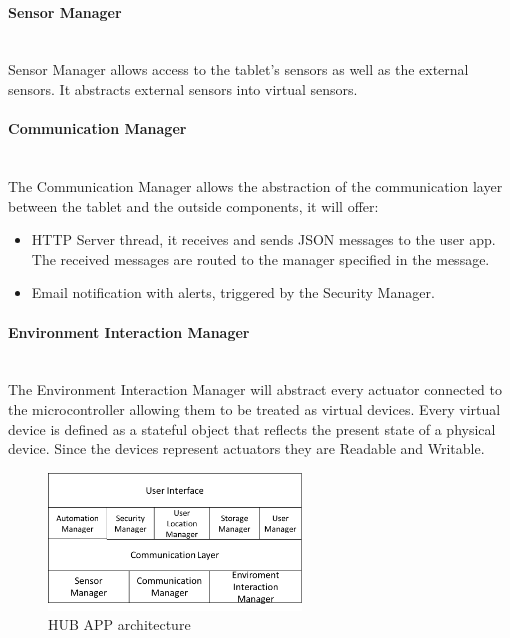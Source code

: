 \paragraph{Sensor Manager}\mbox{}\\
Sensor Manager allows access to the tablet's sensors as well as the external sensors. It abstracts external sensors into virtual sensors.


\paragraph{Communication Manager}\mbox{}\\
The Communication Manager allows the abstraction of the communication layer between the tablet and the outside components, it will offer:

\begin{itemize}
  \item HTTP Server thread, it receives and sends JSON messages to the user app. The received messages are routed to the manager specified in the message.
  \item Email notification with alerts, triggered by the Security Manager.
\end{itemize}

\paragraph{Environment Interaction Manager}\mbox{}\\
The Environment Interaction Manager will abstract every actuator connected to the microcontroller allowing them to be treated as virtual devices. Every virtual device is defined as a stateful object that reflects the present state of a physical device. Since the devices represent actuators they are Readable and Writable.

\begin{figure}[h]
\centering
\includegraphics[width=0.6\textwidth]{Figures/software2}
\caption{HUB APP architecture }
\label{software2}
\end{figure}



